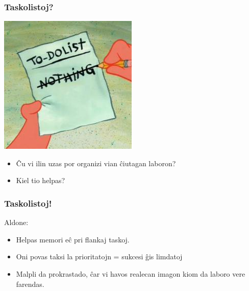   \begin{frame}
    \frametitle{Taskolistoj?}

   	\begin{center}
	   	\includegraphics[scale=0.5]{meme/to_do_list}
   	\end{center}
    
    \begin{itemize}
    	\item Ĉu vi ilin uzas por organizi vian ĉiutagan laboron?
    	\item Kiel tio helpas?
    \end{itemize}
        
  \end{frame}    

   
  \begin{frame}
    \frametitle{Taskolistoj!}
    Aldone:
    \begin{itemize}
    	\item Helpas memori eĉ pri flankaj taskoj.
     	\item Oni povas taksi la prioritatojn = sukcesi ĝis limdatoj
        \item Malpli da prokrastado, ĉar vi havos realecan imagon kiom da laboro vere farendas.      
    \end{itemize}
  \end{frame}      

